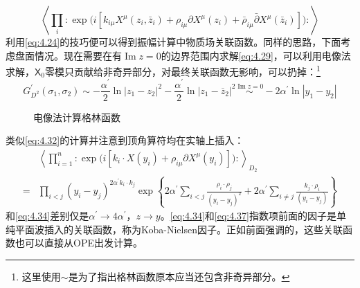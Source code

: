 \begin{equation}
	\left\langle\prod_i:\exp\bigg(i\left[k_{i\mu}X^\mu(z_i,\bar z_i)+\rho_{i\mu}\partial X^\mu(z_i)+\bar\rho_{i\mu}\bar\partial X^\mu(\bar z_i)\right]\bigg):\right\rangle
\end{equation}
利用\ref{eq:4.24}的技巧便可以得到振幅计算中物质场关联函数。同样的思路，下面考虑盘面情况。现在需要在有$\operatorname{Im} z = 0$的边界范围内求解\ref{eq:4.29}，可以利用电像法求解，$\mathsf{X}_0$零模只贡献给非奇异部分，对最终关联函数无影响，可以扔掉：\footnote{这里使用$\sim$是为了指出格林函数原本应当还包含非奇异部分。}
\begin{equation}
	\label{eq:4.36}
	G^{\prime}_{D^2}(\sigma_1,\sigma_2)\sim-\frac{\alpha^{\prime}}{2}\ln|z_1-z_2|^2-\frac{\alpha^{\prime}}{2}\ln|z_1-\overline{z}_2|^2\overset{\operatorname{Im} z = 0}{\sim} -2\alpha^\prime \ln|y_1-y_2|
\end{equation}
\begin{figure}[htbp]
	\centering
	\caption{电像法计算格林函数}
	\label{fig:6}
\end{figure}
类似\ref{eq:4.32}的计算并注意到顶角算符均在实轴上插入：
\begin{equation}
	\label{eq:4.37}
	\begin{aligned}
		&\left\langle\prod_{i=1}^n :\exp\bigg(i\left[k_i\cdot X(y_i)+\rho_{i\mu}\partial X^{\mu}(y_i)\right]\bigg):\right\rangle_{D_2}\\
	=&\prod_{i<j}(y_i-y_j)^{2{\alpha^{\prime}}k_i\cdot k_j}\exp\left\{2{\alpha^{\prime}}\sum_{i<j}\frac{\rho_i\cdot\rho_j}{(y_i-y_j)^2}+2\alpha^{\prime}\sum_{i\neq j}\frac{k_j\cdot\rho_i}{(y_i-y_j)}\right\}
	\end{aligned}
\end{equation}
和\ref{eq:4.34}差别仅是$\alpha^\prime\to4\alpha^\prime$，$z\to y$。\ref{eq:4.34}和\ref{eq:4.37}指数项前面的因子是单纯平面波插入的关联函数，称为Koba-Nielsen因子。正如前面强调的，这些关联函数也可以直接从OPE出发计算。


